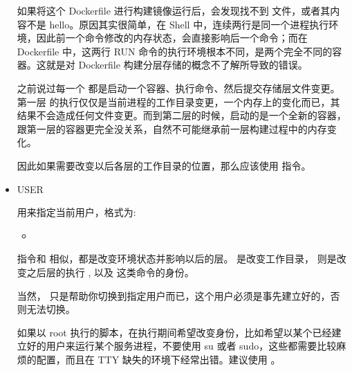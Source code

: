 \documentclass[letterpaper,10pt,english]{sphinxmanual}
\begin{document}
\begin{itemize}
如果将这个 Dockerfile 进行构建镜像运行后，会发现找不到  文件，或者其内容不是 hello。原因其实很简单，在 Shell 中，连续两行是同一个进程执行环境，因此前一个命令修改的内存状态，会直接影响后一个命令；而在 Dockerfile 中，这两行 RUN 命令的执行环境根本不同，是两个完全不同的容器。这就是对 Dockerfile 构建分层存储的概念不了解所导致的错误。

之前说过每一个  都是启动一个容器、执行命令、然后提交存储层文件变更。第一层  的执行仅仅是当前进程的工作目录变更，一个内存上的变化而已，其结果不会造成任何文件变更。而到第二层的时候，启动的是一个全新的容器，跟第一层的容器更完全没关系，自然不可能继承前一层构建过程中的内存变化。

因此如果需要改变以后各层的工作目录的位置，那么应该使用  指令。

\item {} 
USER

用来指定当前用户，格式为:
\begin{itemize}
\item {} 

\end{itemize}

 指令和  相似，都是改变环境状态并影响以后的层。 是改变工作目录， 则是改变之后层的执行 ,  以及 这类命令的身份。

当然， 只是帮助你切换到指定用户而已，这个用户必须是事先建立好的，否则无法切换。

\begin{sphinxVerbatim}[commandchars=\\\{\}]
         
 
 \PYG{p}{[}  \PYG{p}{]}
\end{sphinxVerbatim}

如果以 root 执行的脚本，在执行期间希望改变身份，比如希望以某个已经建立好的用户来运行某个服务进程，不要使用 su 或者 sudo，这些都需要比较麻烦的配置，而且在 TTY 缺失的环境下经常出错。建议使用 。


\end{itemize}
\end{document}
